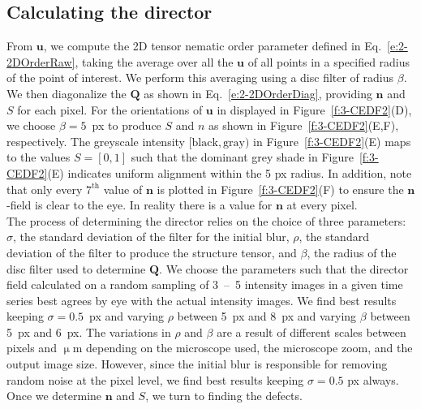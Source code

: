 \subsection{Calculating the director}
From $\mathbf{u}$, we compute the 2D tensor nematic order parameter defined in Eq.~\ref{e:2-2DOrderRaw}, taking the average over all the $\mathbf{u}$ of all points in a specified radius of the point of interest.
We perform this averaging using a disc filter of radius $\beta$.
We then diagonalize the $\mathbf{Q}$ as shown in Eq.~\ref{e:2-2DOrderDiag}, providing $\mathbf{n}$ and $S$ for each pixel.
For the orientations of $\mathbf{u}$ in displayed in Figure~\ref{f:3-CEDF2}(D), we choose $\beta = 5$~px to produce $S$ and $n$ as shown in Figure~\ref{f:3-CEDF2}(E,F), respectively.
The greyscale intensity $[\textrm{black}, \textrm{gray})$ in Figure~\ref{f:3-CEDF2}(E) maps to the values $S = [0, 1]$ such that the dominant grey shade in Figure~\ref{f:3-CEDF2}(E) indicates uniform alignment within the 5 px radius.
In addition, note that only every $7^{\textrm{th}}$ value of $\mathbf{n}$ is plotted in Figure~\ref{f:3-CEDF2}(F) to ensure the $\mathbf{n}$-field is clear to the eye.
In reality there is a value for $\mathbf{n}$ at every pixel. \\

The process of determining the director relies on the choice of three parameters: $\sigma$, the standard deviation of the filter for the initial blur, $\rho$, the standard deviation of the filter to produce the structure tensor, and $\beta$, the radius of the disc filter used to determine $\mathbf{Q}$.
We choose the parameters such that the director field calculated on a random sampling of 3~--~5 intensity images in a given time series best agrees by eye with the actual intensity images.
We find best results keeping $\sigma = 0.5$~px and varying $\rho$ between 5~px and 8~px and varying $\beta$ between 5~px and 6~px.
The variations in $\rho$ and $\beta$ are a result of different scales between pixels and $\upmu$m depending on the microscope used, the microscope zoom, and the output image size.
However, since the initial blur is responsible for removing random noise at the pixel level, we find best results keeping $\sigma = 0.5$ px always.
Once we determine $\mathbf{n}$ and $S$, we turn to finding the defects.


